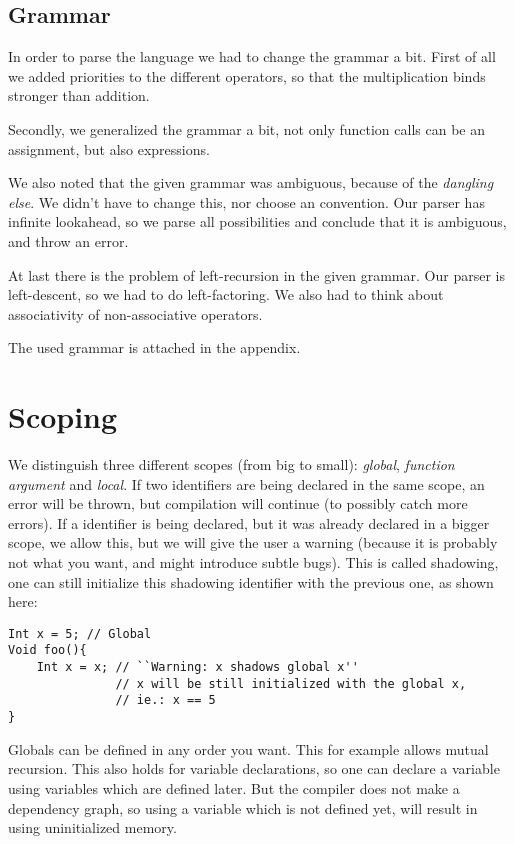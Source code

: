 \documentclass[14pt]{amsart}
\begin{document}
\subsection{Grammar}
In order to parse the language we had to change the grammar a bit. First of all we added priorities to the different operators, so that the multiplication binds stronger than addition.

Secondly, we generalized the grammar a bit, not only function calls can be an assignment, but also expressions.

We also noted that the given grammar was ambiguous, because of the \emph{dangling else}. We didn't have to change this, nor choose an convention. Our parser has infinite lookahead, so we parse all possibilities and conclude that it is ambiguous, and throw an error.

At last there is the problem of left-recursion in the given grammar. Our parser is left-descent, so we had to do left-factoring. We also had to think about associativity of non-associative operators.

The used grammar is attached in the appendix.

\section{Scoping}
We distinguish three different scopes (from big to small): \emph{global}, \emph{function argument} and \emph{local}. If two identifiers are being declared in the same scope, an error will be thrown, but compilation will continue (to possibly catch more errors). If a identifier is being declared, but it was already declared in a bigger scope, we allow this, but we will give the user a warning (because it is probably not what you want, and might introduce subtle bugs). This is called shadowing, one can still initialize this shadowing identifier with the previous one, as shown here:

\begin{lstlisting}
Int x = 5; // Global
Void foo(){
    Int x = x; // ``Warning: x shadows global x''
               // x will be still initialized with the global x,
               // ie.: x == 5
}
\end{lstlisting}

Globals can be defined in any order you want. This for example allows mutual recursion. This also holds for variable declarations, so one can declare a variable using variables which are defined later. But the compiler does not make a dependency graph, so using a variable which is not defined yet, will result in using uninitialized memory.
\end{document}
